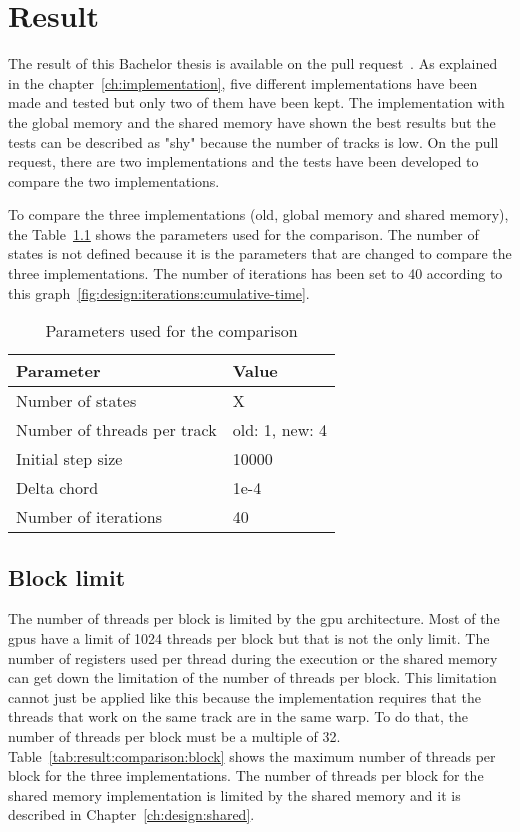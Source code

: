 \chapter{Result}
\label{ch:result}

The result of this Bachelor thesis is available on the pull request~\cite{pull-request-barras}.
As explained in the chapter~\ref{ch:implementation}, five different
implementations have been made and tested but only two of them have been kept.
The implementation with the global memory and the shared memory have shown the
best results but the tests can be described as "shy" because the number of
tracks is low.
On the pull request, there are two implementations and the tests have been
developed to compare the two implementations.

To compare the three implementations (old, global memory and shared memory), the
Table~\ref{tab:result:comparison:parameters} shows the parameters used for the
comparison.
The number of states is not defined because it is the parameters that are changed
to compare the three implementations.
The number of iterations has been set to 40 according to this
graph~\ref{fig:design:iterations:cumulative-time}.

\begin{table}[ht]
    \centering
    \begin{tabular}{|l|l|}
        \hline
        \textbf{Parameter} & \textbf{Value} \\
        \hline
        Number of states & X \\
        \hline
        Number of threads per track & old: 1, new: 4 \\
        \hline
        Initial step size & 10000 \\
        \hline
        Delta chord & 1e-4 \\
        \hline
        Number of iterations & 40 \\
        \hline
    \end{tabular}
    \caption{Parameters used for the comparison}
    \label{tab:result:comparison:parameters}
\end{table}

\section{Block limit}
\label{ch:result:comparison:block}

The number of threads per block is limited by the \acrshort{gpu} architecture.
Most of the \acrshort{gpu}s have a limit of 1024 threads per block but that is
not the only limit.
The number of registers used per thread during the execution or the shared memory
can get down the limitation of the number of threads per block.
This limitation cannot just be applied like this because the implementation
requires that the threads that work on the same track are in the same warp.
To do that, the number of threads per block must be a multiple of 32.
Table~\ref{tab:result:comparison:block} shows the maximum number of threads per
block for the three implementations.
The number of threads per block for the shared memory implementation is limited
by the shared memory and it is described in Chapter~\ref{ch:design:shared}.

